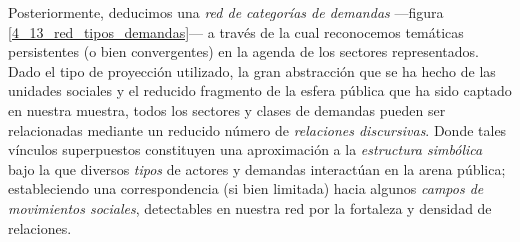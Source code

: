 \documentclass[letterpaper, 11pt]{book}
\theoremstyle{definition}
\theoremstyle{remark}
\begin{document}





Posteriormente, deducimos una \emph{red de categorías de demandas} ---figura \ref{4_13_red_tipos_demandas}--- a través de la cual reconocemos temáticas persistentes (o bien convergentes) en la agenda de los sectores representados. 
Dado el tipo de proyección utilizado, la gran abstracción que se ha hecho de las unidades sociales y el reducido fragmento de la esfera pública que ha sido captado en nuestra muestra, todos los sectores y clases de demandas pueden ser relacionadas mediante un reducido número de \emph{relaciones discursivas}. 
Donde tales vínculos superpuestos constituyen una aproximación a la \emph{estructura simbólica} bajo la que diversos \emph{tipos} de actores y demandas interactúan en la arena pública; estableciendo una correspondencia (si bien limitada) hacia algunos \emph{campos de movimientos sociales}, detectables en nuestra red por la fortaleza y densidad de relaciones. 
\end{document}
